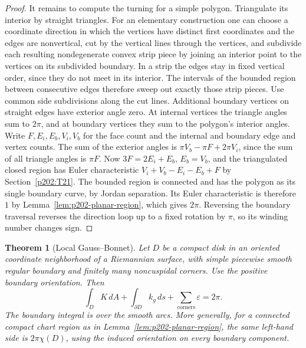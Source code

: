 \documentclass[11pt,oneside,openany]{book}
\theoremstyle{plain}
\newtheorem{theorem}{Theorem}[chapter]
\theoremstyle{definition}
\theoremstyle{remark}
\begin{document}
\begin{proof}
It remains to compute the turning for a simple polygon.
Triangulate its interior by straight triangles. For an
elementary construction one can choose a coordinate
direction in which the vertices have distinct first
coordinates and the edges are nonvertical, cut by the
vertical lines through the vertices, and subdivide each
resulting nondegenerate convex strip piece by joining an
interior point to the vertices on its subdivided boundary.
In a strip the edges stay in fixed vertical order, since
they do not meet in its interior. The intervals of the
bounded region between consecutive edges therefore sweep
out exactly those strip pieces. Use common side subdivisions
along the cut lines. Additional boundary vertices on
straight edges have exterior angle zero. At internal
vertices the triangle angles sum to \(2\pi\), and at
boundary vertices they sum to the polygon's interior
angles. Write \(F,E_i,E_b,V_i,V_b\) for the face count
and the internal and boundary edge and vertex counts.
The sum of the exterior angles is
\(\pi V_b-\pi F+2\pi V_i\), since the sum of all triangle
angles is \(\pi F\). Now \(3F=2E_i+E_b\), \(E_b=V_b\),
and the triangulated closed region has Euler characteristic
\(V_i+V_b-E_i-E_b+F\) by Section~\ref{p202:T21}.
The bounded region is connected and has the polygon as its
single boundary curve, by Jordan separation. Its Euler
characteristic is therefore \(1\) by Lemma~\ref{lem:p202-planar-region},
which gives \(2\pi\). Reversing the boundary traversal reverses
the direction loop up to a fixed rotation by \(\pi\), so its
winding number changes sign.
\end{proof}

\begin{theorem}[Local Gauss--Bonnet]\label{thm:p202-local-gb}
Let \(D\) be a compact disk in an oriented coordinate
neighborhood of a Riemannian surface, with simple piecewise
smooth regular boundary and finitely many noncuspidal
corners. Use the positive boundary orientation. Then
\[
 \int_D K\,dA+\int_{\partial D}k_g\,ds+
   \sum_{\text{corners}}\varepsilon=2\pi .
\]
The boundary integral is over the smooth arcs. More generally,
for a connected compact chart region as in
Lemma~\ref{lem:p202-planar-region}, the same left-hand side is
\(2\pi\chi(D)\), using the induced orientation on every boundary
component.
\end{theorem}
\end{document}
